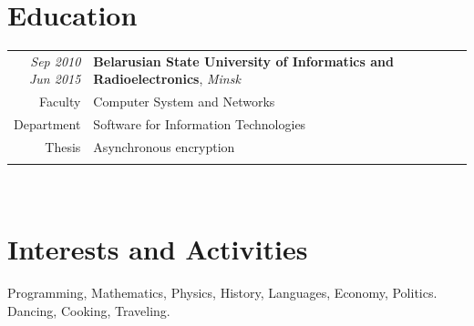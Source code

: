 \documentclass[]{friggeri-cv}
\begin{document}
\section{Education}
    \begin{tabular}[\textwidth]{rp{11cm}}
        \em \makecell[r]{Sep 2010\\Jun 2015} & \textbf{Belarusian State University of Informatics and Radioelectronics}, \textit{Minsk} \\
        Faculty & Computer System and Networks\\ 
        Department & Software for Information Technologies\\
        Thesis & Asynchronous encryption\\
        \multicolumn{2}{c}{} \\	
    \end{tabular}\\
    
\section{Interests and Activities}

Programming, Mathematics, Physics, History, Languages, Economy, Politics.\\
Dancing, Cooking, Traveling.
\end{document}

